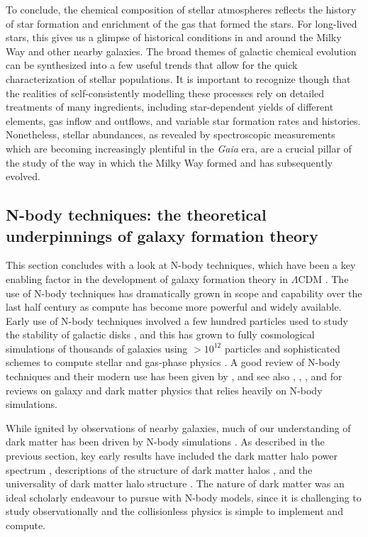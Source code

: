 To conclude, the chemical composition of stellar atmospheres reflects the history of star formation and enrichment of the gas that formed the stars. For long-lived stars, this gives us a glimpse of historical conditions in and around the Milky Way and other nearby galaxies. The broad themes of galactic chemical evolution can be synthesized into a few useful trends that allow for the quick characterization of stellar populations. It is important to recognize though that the realities of self-consistently modelling these processes rely on detailed treatments of many ingredients, including star-dependent yields of different elements, gas inflow and outflows, and variable star formation rates and histories. Nonetheless, stellar abundances, as revealed by spectroscopic measurements which are becoming increasingly plentiful in the \textit{Gaia} era, are a crucial pillar of the study of the way in which the Milky Way formed and has subsequently evolved.

\subsection{N-body techniques: the theoretical underpinnings of galaxy formation theory}

This section concludes with a look at N-body techniques, which have been a key enabling factor in the development of galaxy formation theory in $\Lambda$CDM \parencite{frenk12}. The use of N-body techniques has dramatically grown in scope and capability over the last half century as compute has become more powerful and widely available. Early use of N-body techniques involved a few hundred particles used to study the stability of galactic disks \parencite[e.g.][]{ostriker73}, and this has grown to fully cosmological simulations of thousands of galaxies using $> 10^{12}$ particles and sophisticated schemes to compute stellar and gas-phase physics \parencite[e.g.][]{eagle_model_crain15,wetzel16,tng_model_pillepich18}. A good review of N-body techniques and their modern use has been given by \textcite{crain23}, and see also \textcite{frenk12}, \textcite{somerville15}, \textcite{bullock17}, and \textcite{wechsler18} for reviews on galaxy and dark matter physics that relies heavily on N-body simulations.

While ignited by observations of nearby galaxies, much of our understanding of dark matter has been driven by N-body simulations \parencite{frenk12}. As described in the previous section, key early results have included the dark matter halo power spectrum \parencite{press74}, descriptions of the structure of dark matter halos \parencite{efstathiou88,dubinski91}, and the universality of dark matter halo structure \parencite{navarro96,navarro97}. The nature of dark matter was an ideal scholarly endeavour to pursue with N-body models, since it is challenging to study observationally and the collisionless physics is simple to implement and compute. 

